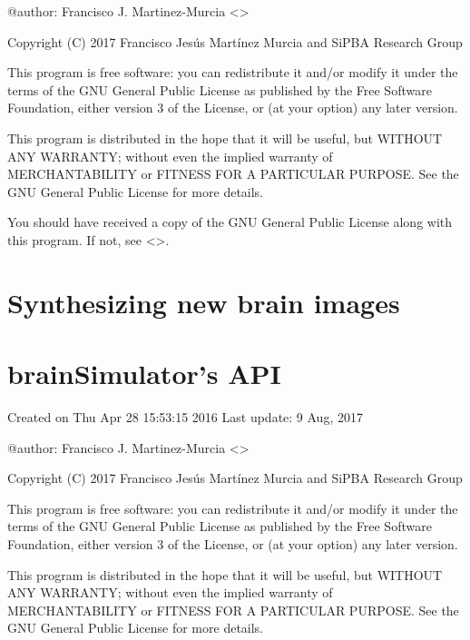 \documentclass[letterpaper,10pt,english]{sphinxmanual}
\begin{document}
@author: Francisco J. Martinez-Murcia \textless{}\textgreater{}

Copyright (C) 2017 Francisco Jesús Martínez Murcia and SiPBA Research Group

This program is free software: you can redistribute it and/or modify
it under the terms of the GNU General Public License as published by
the Free Software Foundation, either version 3 of the License, or
(at your option) any later version.

This program is distributed in the hope that it will be useful,
but WITHOUT ANY WARRANTY; without even the implied warranty of
MERCHANTABILITY or FITNESS FOR A PARTICULAR PURPOSE.  See the
GNU General Public License for more details.

You should have received a copy of the GNU General Public License
along with this program.  If not, see \textless{}\textgreater{}.


\chapter{Synthesizing new brain images}
\label{\detokenize{synthesizing:synthesizing-new-brain-images}}\label{\detokenize{synthesizing::doc}}

\chapter{brainSimulator’s API}
\label{\detokenize{api:brainsimulator-s-api}}\label{\detokenize{api:module-brainSimulator}}\label{\detokenize{api::doc}}\label{\detokenize{api:module-brainSimulator}}
Created on Thu Apr 28 15:53:15 2016
Last update: 9 Aug, 2017

@author: Francisco J. Martinez-Murcia \textless{}\textgreater{}

Copyright (C) 2017 Francisco Jesús Martínez Murcia and SiPBA Research Group

This program is free software: you can redistribute it and/or modify
it under the terms of the GNU General Public License as published by
the Free Software Foundation, either version 3 of the License, or
(at your option) any later version.

This program is distributed in the hope that it will be useful,
but WITHOUT ANY WARRANTY; without even the implied warranty of
MERCHANTABILITY or FITNESS FOR A PARTICULAR PURPOSE.  See the
GNU General Public License for more details.
\end{document}
